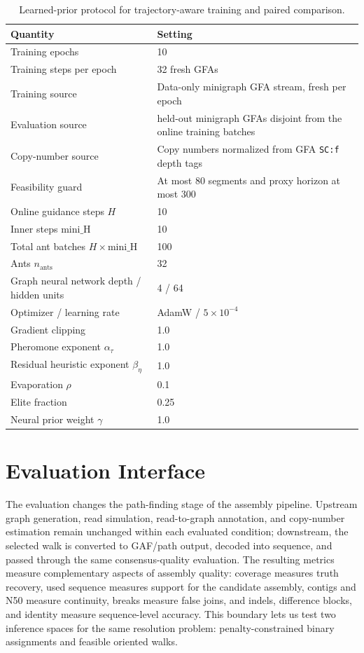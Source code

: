 \documentclass[11pt]{article}
\begin{document}
\begin{table}[t]
\centering
\caption{Learned-prior protocol for trajectory-aware training and paired comparison.}
\label{tab:dynaco-settings}
\begin{tabular}{ll}
\hline
Quantity & Setting \\
\hline
Training epochs & 10 \\
Training steps per epoch & 32 fresh GFAs \\
Training source & Data-only minigraph GFA stream, fresh per epoch \\
Evaluation source & held-out minigraph GFAs disjoint from the online training batches \\
Copy-number source & Copy numbers normalized from GFA \texttt{SC:f} depth tags \\
Feasibility guard & At most 80 segments and proxy horizon at most 300 \\
Online guidance steps $H$ & 10 \\
Inner steps $\mathrm{mini\_H}$ & 10 \\
Total ant batches $H\times\mathrm{mini\_H}$ & 100 \\
Ants $n_{\mathrm{ants}}$ & 32 \\
Graph neural network depth / hidden units & 4 / 64 \\
Optimizer / learning rate & AdamW \citep{loshchilov2019adamw} / $5\times10^{-4}$ \\
Gradient clipping & 1.0 \\
Pheromone exponent $\alpha_\tau$ & 1.0 \\
Residual heuristic exponent $\beta_\eta$ & 1.0 \\
Evaporation $\rho$ & 0.1 \\
Elite fraction & 0.25 \\
Neural prior weight $\gamma$ & 1.0 \\
\hline
\end{tabular}
\end{table}

\section{Evaluation Interface}

The evaluation changes the path-finding stage of the assembly pipeline. Upstream graph generation, read simulation, read-to-graph annotation, and copy-number estimation remain unchanged within each evaluated condition; downstream, the selected walk is converted to GAF/path output, decoded into sequence, and passed through the same consensus-quality evaluation. The resulting metrics measure complementary aspects of assembly quality: coverage measures truth recovery, used sequence measures support for the candidate assembly, contigs and N50 measure continuity, breaks measure false joins, and indels, difference blocks, and identity measure sequence-level accuracy. This boundary lets us test two inference spaces for the same resolution problem: penalty-constrained binary assignments and feasible oriented walks.
\end{document}
